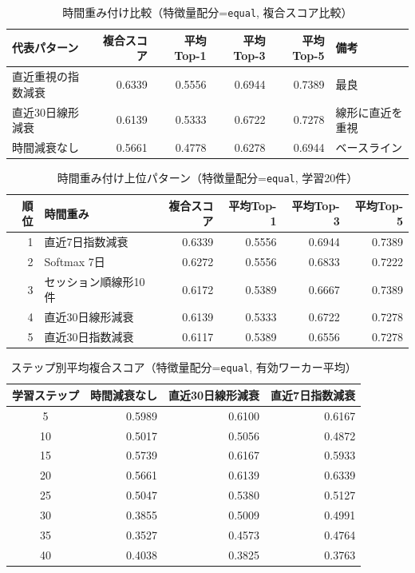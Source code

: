 \begin{table}[htbp]
\centering
\caption{時間重み付け比較（特徴量配分=\texttt{equal}, 複合スコア比較）}
\scriptsize
\begin{tabular}{l r r r r l}
\hline
代表パターン & 複合スコア & 平均Top-1 & 平均Top-3 & 平均Top-5 & 備考 \\
\hline
直近重視の指数減衰 & 0.6339 & 0.5556 & 0.6944 & 0.7389 & 最良 \\
直近30日線形減衰 & 0.6139 & 0.5333 & 0.6722 & 0.7278 & 線形に直近を重視 \\
時間減衰なし & 0.5661 & 0.4778 & 0.6278 & 0.6944 & ベースライン \\
\hline
\end{tabular}
\end{table}

\begin{table}[htbp]
\centering
\caption{時間重み付け上位パターン（特徴量配分=\texttt{equal}, 学習20件）}
\label{tab:time-weighting-top-patterns-equal}
\scriptsize
\begin{tabular}{r l r r r r}
\hline
順位 & 時間重み & 複合スコア & 平均Top-1 & 平均Top-3 & 平均Top-5 \\
\hline
1 & 直近7日指数減衰 & 0.6339 & 0.5556 & 0.6944 & 0.7389 \\
2 & Softmax 7日 & 0.6272 & 0.5556 & 0.6833 & 0.7222 \\
3 & セッション順線形10件 & 0.6172 & 0.5389 & 0.6667 & 0.7389 \\
4 & 直近30日線形減衰 & 0.6139 & 0.5333 & 0.6722 & 0.7278 \\
5 & 直近30日指数減衰 & 0.6117 & 0.5389 & 0.6556 & 0.7278 \\
\hline
\end{tabular}
\end{table}

\begin{table}[htbp]
\centering
\caption{ステップ別平均複合スコア（特徴量配分=\texttt{equal}, 有効ワーカー平均）}
\label{tab:time-weighting-steps}
\scriptsize
\begin{tabular}{c r r r}
\hline
学習ステップ & 時間減衰なし & 直近30日線形減衰 & 直近7日指数減衰 \\
\hline
5  & 0.5989 & 0.6100 & 0.6167 \\
10 & 0.5017 & 0.5056 & 0.4872 \\
15 & 0.5739 & 0.6167 & 0.5933 \\
20 & 0.5661 & 0.6139 & 0.6339 \\
25 & 0.5047 & 0.5380 & 0.5127 \\
30 & 0.3855 & 0.5009 & 0.4991 \\
35 & 0.3527 & 0.4573 & 0.4764 \\
40 & 0.4038 & 0.3825 & 0.3763 \\
\hline
\end{tabular}
\end{table}

